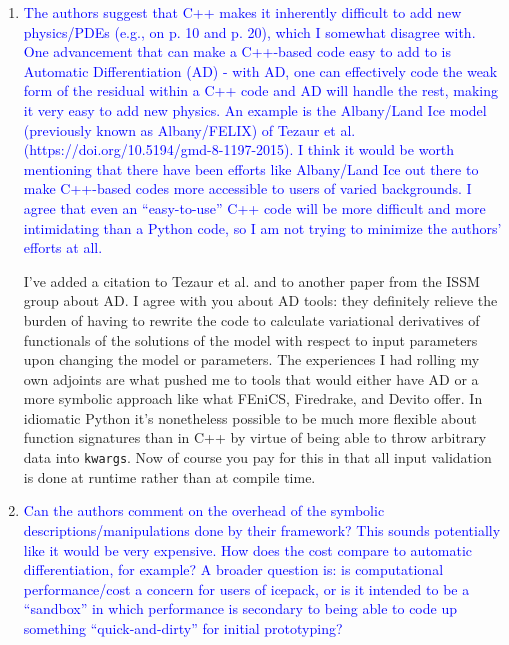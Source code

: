 \documentclass{article}
\theoremstyle{definition}
\theoremstyle{plain}
\begin{document}
\begin{enumerate}
\item \textcolor{blue}{The authors suggest that C++ makes it inherently difficult to add new physics/PDEs (e.g., on p. 10
and p. 20), which I somewhat disagree with. One advancement that can make a C++-based code
easy to add to is Automatic Differentiation (AD) - with AD, one can effectively code the weak form
of the residual within a C++ code and AD will handle the rest, making it very easy to add new
physics. An example is the Albany/Land Ice model (previously known as Albany/FELIX) of Tezaur
et al. (https://doi.org/10.5194/gmd-8-1197-2015). I think it would be worth mentioning that
there have been efforts like Albany/Land Ice out there to make C++-based codes more accessible to
users of varied backgrounds. I agree that even an “easy-to-use” C++ code will be more difficult and
more intimidating than a Python code, so I am not trying to minimize the authors’ efforts at all.}

I've added a citation to Tezaur et al. and to another paper from the ISSM group about AD.
I agree with you about AD tools: they definitely relieve the burden of having to rewrite the code to calculate variational derivatives of functionals of the solutions of the model with respect to input parameters upon changing the model or parameters.
The experiences I had rolling my own adjoints are what pushed me to tools that would either have AD or a more symbolic approach like what FEniCS, Firedrake, and Devito offer.
In idiomatic Python it's nonetheless possible to be much more flexible about function signatures than in C++ by virtue of being able to throw arbitrary data into \texttt{kwargs}.
Now of course you pay for this in that all input validation is done at runtime rather than at compile time.

\item \textcolor{blue}{Can the authors comment on the overhead of the symbolic descriptions/manipulations done by their
framework? This sounds potentially like it would be very expensive. How does the cost compare to
automatic differentiation, for example? A broader question is: is computational performance/cost a
concern for users of icepack, or is it intended to be a “sandbox” in which performance is secondary
to being able to code up something “quick-and-dirty” for initial prototyping?}


\end{enumerate}
\end{document}
